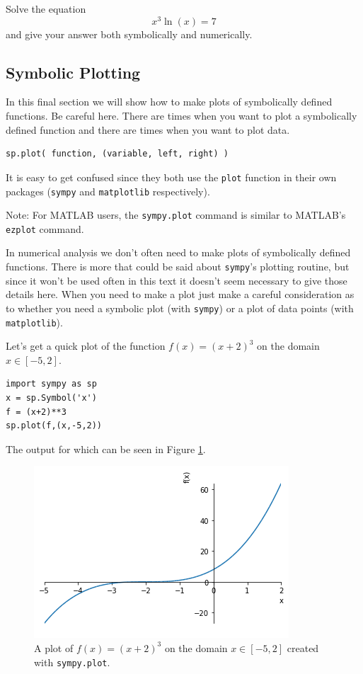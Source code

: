 \begin{problem}
    Solve the equation 
$$x^3 \ln(x) = 7$$
and give your answer both symbolically and numerically.
\end{problem}

\subsection{Symbolic Plotting}
In this final section we will show how to make plots of symbolically defined functions.
Be careful here.  There are times when you want to plot a symbolically defined function
and there are times when you want to plot data.  
\begin{lstlisting}
sp.plot( function, (variable, left, right) )
\end{lstlisting}
It is easy to get confused since they
both use the \texttt{plot} function in their own packages (\texttt{sympy} and
\texttt{matplotlib} respectively).

Note: For MATLAB users, the \texttt{sympy.plot} command is similar to MATLAB's
\texttt{ezplot} command.

In numerical analysis we don't often need to make plots of symbolically defined functions.
There is more that could be said about \texttt{sympy}'s plotting routine, but since it
won't be used often in this text it doesn't seem necessary to give those details here.
When you need to make a plot just make a careful consideration as to whether you need a
symbolic plot (with \texttt{sympy}) or a plot of data points (with \texttt{matplotlib}).

\begin{example}
    Let's get a quick plot of the function $f(x) = (x+2)^3$ on the domain $x \in [-5,2]$.

\bcode
\begin{lstlisting}
import sympy as sp
x = sp.Symbol('x')
f = (x+2)**3
sp.plot(f,(x,-5,2))
\end{lstlisting}
The output for which can be seen in Figure \ref{fig:sympy_plot_1}.
\end{example}

\begin{figure}[ht!]
    \centering
    \includegraphics[width=0.6\columnwidth]{Images/sympy_plot_1.png}
    \caption{A plot of $f(x) = (x+2)^3$ on the domain $x \in [-5,2]$ created with
        \texttt{sympy.plot}.}
    \label{fig:sympy_plot_1}
\end{figure}

